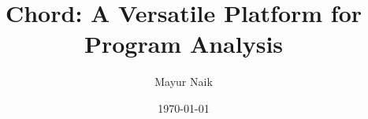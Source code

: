 \documentclass{article}
\title{Chord: A Versatile Platform for Program Analysis}
\author{Mayur Naik}
\date{\today}
\begin{document}
\maketitle


\texonly{\newpage}

\texonly{\newpage}

\texonly{\newpage}

\texonly{\newpage}

\texonly{\newpage}

\texonly{\newpage}

\texonly{\newpage}

\texonly{\newpage}

\texonly{\newpage}

\texonly{\newpage}

\texonly{\newpage}

\texonly{\newpage}

\texonly{\newpage}
%
%

\texonly{\newpage}

\texonly{\newpage}

\texonly{\newpage}

\end{document}
